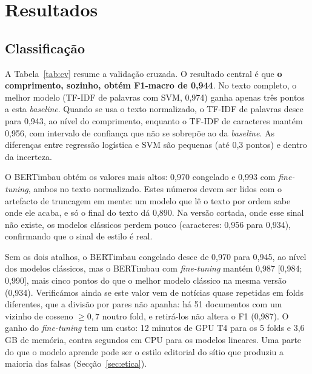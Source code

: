 \section{Resultados}\label{sec:resultados}

\subsection{Classificação}



A Tabela~\ref{tab:cv} resume a validação cruzada. O resultado central é que \textbf{o comprimento,
sozinho, obtém F1-macro de 0,944}. No texto completo, o melhor modelo (TF-IDF de palavras com SVM,
0,974) ganha apenas três pontos a esta \emph{baseline}. Quando se usa o texto normalizado, o TF-IDF
de palavras desce para 0,943, ao nível do comprimento, enquanto o TF-IDF de caracteres mantém 0,956,
com intervalo de confiança que não se sobrepõe ao da \emph{baseline}. As diferenças entre regressão
logística e SVM são pequenas (até 0,3 pontos) e dentro da incerteza.

O BERTimbau obtém os valores mais altos: 0,970 congelado e 0,993 com \emph{fine-tuning}, ambos no
texto normalizado. Estes números devem ser lidos com o artefacto de truncagem em mente: um modelo
que lê o texto por ordem sabe onde ele acaba, e só o final do texto dá 0,890. Na versão cortada,
onde esse sinal não existe, os modelos clássicos perdem pouco (caracteres: 0,956 para 0,934),
confirmando que o sinal de estilo é real.

Sem os dois atalhos, o BERTimbau congelado desce de 0,970 para 0,945, ao nível dos modelos
clássicos, mas o BERTimbau com \emph{fine-tuning} mantém 0,987 [0,984; 0,990], mais cinco pontos
do que o melhor modelo clássico na mesma versão (0,934). Verificámos ainda se este valor vem de
notícias quase repetidas em folds diferentes, que a divisão por pares não apanha: há 51 documentos
com um vizinho de cosseno $\geq0{,}7$ noutro fold, e retirá-los não altera o F1 (0,987). O ganho do
\emph{fine-tuning} tem um custo: 12 minutos de GPU T4 para os 5 folds e 3,6\,GB de memória,
contra segundos em CPU para os modelos lineares. Uma parte do que o modelo aprende pode ser o estilo
editorial do sítio que produziu a maioria das falsas (Secção~\ref{sec:etica}).

